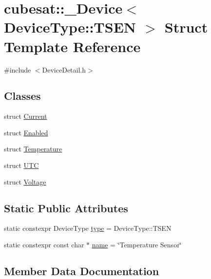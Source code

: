 \hypertarget{structcubesat_1_1__Device_3_01DeviceType_1_1TSEN_01_4}{}\section{cubesat\+:\+:\+\_\+\+Device$<$ Device\+Type\+:\+:T\+S\+EN $>$ Struct Template Reference}
\label{structcubesat_1_1__Device_3_01DeviceType_1_1TSEN_01_4}


{\ttfamily \#include $<$Device\+Detail.\+h$>$}

\subsection*{Classes}
\begin{DoxyCompactItemize}
\item 
struct \hyperlink{structcubesat_1_1__Device_3_01DeviceType_1_1TSEN_01_4_1_1Current}{Current}
\item 
struct \hyperlink{structcubesat_1_1__Device_3_01DeviceType_1_1TSEN_01_4_1_1Enabled}{Enabled}
\item 
struct \hyperlink{structcubesat_1_1__Device_3_01DeviceType_1_1TSEN_01_4_1_1Temperature}{Temperature}
\item 
struct \hyperlink{structcubesat_1_1__Device_3_01DeviceType_1_1TSEN_01_4_1_1UTC}{U\+TC}
\item 
struct \hyperlink{structcubesat_1_1__Device_3_01DeviceType_1_1TSEN_01_4_1_1Voltage}{Voltage}
\end{DoxyCompactItemize}
\subsection*{Static Public Attributes}
\begin{DoxyCompactItemize}
\item 
static constexpr Device\+Type \hyperlink{structcubesat_1_1__Device_3_01DeviceType_1_1TSEN_01_4_af57f7ba7f2c1b9305b64a89bacf03ca5}{type} = Device\+Type\+::\+T\+S\+EN
\item 
static constexpr const char $\ast$ \hyperlink{structcubesat_1_1__Device_3_01DeviceType_1_1TSEN_01_4_acc3e93a4d515b2c65719ae6819e7a700}{name} = \char`\"{}Temperature Sensor\char`\"{}
\end{DoxyCompactItemize}


\subsection{Member Data Documentation}
\mbox{\label{structcubesat_1_1__Device_3_01DeviceType_1_1TSEN_01_4_acc3e93a4d515b2c65719ae6819e7a700}} 

